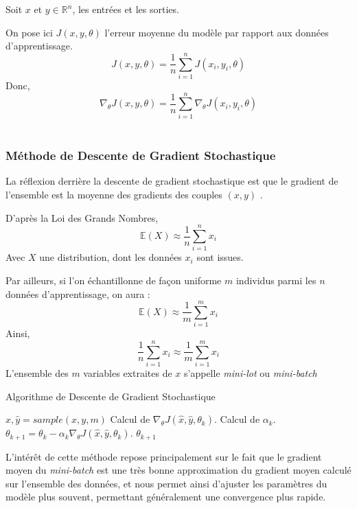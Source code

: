 \documentclass[a4paper, 10pt]{report}
\begin{document}
Soit $x$ et $y \in \mathbb{R}^n$, les entrées et les sorties.

On pose ici $J(x,y,\theta)$ l'erreur moyenne du modèle par rapport aux données d'apprentissage.
$$J(x,y,\theta) = \frac{1}{n} \sum_{i=1}^{n}{J(x_i,y_i,\theta)}$$
Donc,
$$\nabla_\theta J(x,y,\theta) = \frac{1}{n} \sum_{i=1}^{n}{\nabla_\theta J(x_i,y_i,\theta)}$$
\			
\subsubsection{Méthode de Descente de Gradient Stochastique}
La réflexion derrière la descente de gradient stochastique est que le gradient de l'ensemble est la moyenne des gradients des couples $(x,y)$ .

D'après la Loi des Grands Nombres, $$\mathbb{E}(X) \approx \frac{1}{n} \sum_{i=1}^{n}{x_i}$$
Avec $X$ une distribution, dont les données $x_i$ sont issues.

Par ailleurs, si l'on échantillonne de façon uniforme $m$ individus parmi les $n$ données d'apprentissage, on aura :
$$\mathbb{E}(X) \approx \frac{1}{m} \sum_{i=1}^{m}{x_i}$$
Ainsi,
$$\frac{1}{n} \sum_{i=1}^{n}{x_i} \approx \frac{1}{m} \sum_{i=1}^{m}{x_i}$$
L'ensemble des $m$ variables extraites de $x$ s'appelle \emph{mini-lot} ou \emph{mini-batch}
\begin{algorithm}[H]
	\caption{Algorithme de Descente de Gradient Stochastique}
	\begin{algorithmic}
		\REPEAT
		\STATE $\hat{x},\hat{y} = sample(x,y,m)$
		\STATE Calcul de $\nabla_\theta J(\hat{x},\hat{y},\theta_k)$.
		\STATE Calcul de $\alpha_k$.
		\STATE $\theta_{k+1} = \theta_k - \alpha_k \nabla_\theta J(\hat{x},\hat{y},\theta_k)$.
		\UNTIL{$\nabla_\theta J(\hat{x},\hat{y},\theta_k) \leq \epsilon$}
		\RETURN $\theta_{k+1}$
	\end{algorithmic}
\end{algorithm}
L'intérêt de cette méthode repose principalement sur le fait que le gradient moyen du \emph{mini-batch} est une très bonne approximation du gradient moyen calculé sur l'ensemble des données, et nous permet ainsi d'ajuster les paramètres du modèle plus souvent, permettant généralement une convergence plus rapide.
\end{document}
